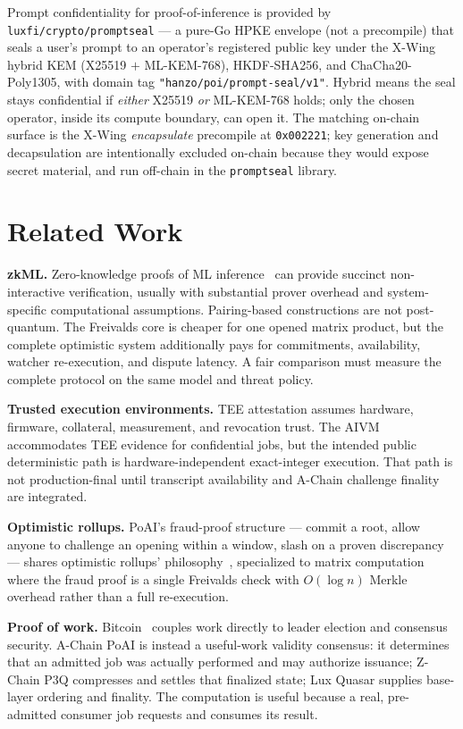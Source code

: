 \documentclass[11pt,a4paper]{article}
\begin{document}
Prompt confidentiality for proof-of-inference is provided by \texttt{luxfi/crypto/promptseal} --- a pure-Go HPKE envelope (not a precompile) that seals a user's prompt to an operator's registered public key under the X-Wing hybrid KEM (X25519 $+$ ML-KEM-768), HKDF-SHA256, and ChaCha20-Poly1305, with domain tag \texttt{"hanzo/poi/prompt-seal/v1"}. Hybrid means the seal stays confidential if \emph{either} X25519 \emph{or} ML-KEM-768 holds; only the chosen operator, inside its compute boundary, can open it. The matching on-chain surface is the X-Wing \emph{encapsulate} precompile at \texttt{0x002221}; key generation and decapsulation are intentionally excluded on-chain because they would expose secret material, and run off-chain in the \texttt{promptseal} library.

\section{Related Work}

\textbf{zkML.} Zero-knowledge proofs of ML inference~\cite{zkml} can provide succinct non-interactive verification, usually with substantial prover overhead and system-specific computational assumptions. Pairing-based constructions are not post-quantum. The Freivalds core is cheaper for one opened matrix product, but the complete optimistic system additionally pays for commitments, availability, watcher re-execution, and dispute latency. A fair comparison must measure the complete protocol on the same model and threat policy.

\textbf{Trusted execution environments.} TEE attestation assumes hardware, firmware, collateral, measurement, and revocation trust. The AIVM accommodates TEE evidence for confidential jobs, but the intended public deterministic path is hardware-independent exact-integer execution. That path is not production-final until transcript availability and A-Chain challenge finality are integrated.

\textbf{Optimistic rollups.} PoAI's fraud-proof structure --- commit a root, allow anyone to challenge an opening within a window, slash on a proven discrepancy --- shares optimistic rollups' philosophy~\cite{optimistic}, specialized to matrix computation where the fraud proof is a single Freivalds check with $O(\log n)$ Merkle overhead rather than a full re-execution.

\textbf{Proof of work.} Bitcoin~\cite{bitcoin} couples work directly to leader election and consensus security. A-Chain PoAI is instead a useful-work validity consensus: it determines that an admitted job was actually performed and may authorize issuance; Z-Chain P3Q compresses and settles that finalized state; Lux Quasar supplies base-layer ordering and finality. The computation is useful because a real, pre-admitted consumer job requests and consumes its result.
\end{document}
